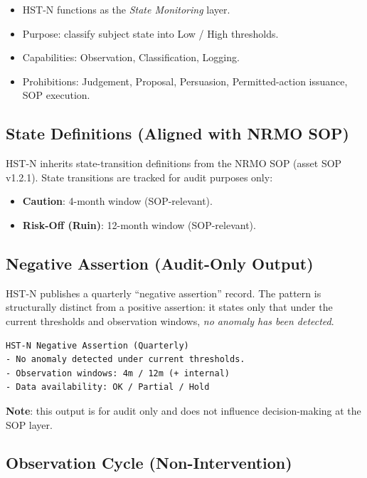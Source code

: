 \begin{itemize}
\item HST-N functions as the \emph{State Monitoring} layer.
\item Purpose: classify subject state into Low / High thresholds.
\item Capabilities: Observation, Classification, Logging.
\item Prohibitions: Judgement, Proposal, Persuasion,
Permitted-action issuance, SOP execution.
\end{itemize}

\subsection{State Definitions (Aligned with NRMO SOP)}
\label{sec:hstn-v11-state-definitions}

HST-N inherits state-transition definitions from the NRMO SOP
(asset SOP v1.2.1). State transitions are tracked for audit
purposes only:

\begin{itemize}
\item \textbf{Caution}: 4-month window (SOP-relevant).
\item \textbf{Risk-Off (Ruin)}: 12-month window (SOP-relevant).
\end{itemize}

\subsection{Negative Assertion (Audit-Only Output)}
\label{sec:hstn-v11-negative-assertion}

HST-N publishes a quarterly ``negative assertion'' record. The
pattern is structurally distinct from a positive assertion: it
states only that under the current thresholds and observation
windows, \emph{no anomaly has been detected}.

\begin{lstlisting}[basicstyle=\ttfamily\small,frame=single]
HST-N Negative Assertion (Quarterly)
- No anomaly detected under current thresholds.
- Observation windows: 4m / 12m (+ internal)
- Data availability: OK / Partial / Hold
\end{lstlisting}

\noindent
\textbf{Note}: this output is for audit only and does not influence
decision-making at the SOP layer.

\subsection{Observation Cycle (Non-Intervention)}
\label{sec:hstn-v11-observation-cycle}


